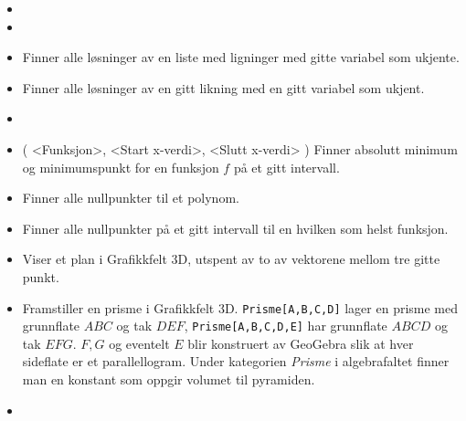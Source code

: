 \begin{itemize}
\item {}	

\item {}

\item 
{}
{Finner alle løsninger av en liste med ligninger med gitte variabel som ukjente.}

\item {}
{Finner alle løsninger av en gitt likning med en gitt variabel som ukjent.}

\item {}

\item {}( <Funksjon>, <Start x-verdi>, <Slutt x-verdi> ) {Finner absolutt minimum og minimumspunkt for en funksjon $ f $ på et gitt intervall.}

\item {}
{Finner alle nullpunkter til et polynom.}

\item {}
{Finner alle nullpunkter på et gitt intervall til en hvilken som helst funksjon.}

\item {}
{Viser et plan i Grafikkfelt 3D, utspent av to av vektorene mellom tre gitte punkt.}

\item {}
{Framstiller en prisme i Grafikkfelt 3D. {\tt Prisme[A,B,C,D]} lager en prisme med grunnflate $ ABC $ og tak $ DEF $, {\tt Prisme[A,B,C,D,E]} har grunnflate $ ABCD $ og tak $ EFG $. $ F, G$ og eventelt $ E $ blir konstruert av GeoGebra slik at hver sideflate er et parallellogram. Under kategorien \textsl{Prisme} i algebrafaltet finner man en konstant som oppgir volumet til pyramiden.}

\item {}
\end{itemize}
